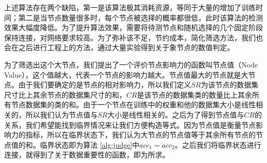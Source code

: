 上述算法存在两个缺陷，第一是该算法极其消耗资源，等同于大量的增加了训练时间；第二是当节点数量很多时，每个节点被选择的概率都很低，此时该算法的检测效果大幅度降低。为了提升算法效果，需要将待测节点和随机选择的几个固定阶段保持连接，对网络要求较高。为了弥补该不足，节约成本，简化筛选方法，我们也会在之后进行工程上的方法，通过大量实验得到关于象节点的数值判定。

为了筛选出这个大节点，我们提出了一个评价节点影响力的函数叫节点值（Node Value），这个值越大，代表一个节点的影响力越大。节点值最大的节点就是大节点。由于我们要确定的是节点的相对影响力，所以我们定义$SR$为该节点的数据集尺寸比上其余节点的数据集尺寸的和，$CR$是该节点的数据集类的数量比上其余所有节点数据集的类的和。由于一个节点在训练中的权重和他的数据集大小是线性相关的，所以我们认为节点值与$SR$大小是线性相关的。之后为了得到节点值与$CR$的关系，我们希望能找到临界情况来让我们方便构造等式。因为节点值是衡量节点影响力的指标，所以在临界状态下，我们认为大节点的节点值等于其余所有节点的节点值的和。临界状态即为算法 \ref{alg:judge}中$acc_1=acc_2$。之后我们将临界状态进行连接，就得到了关于数据重要性的函数，即为所求。
